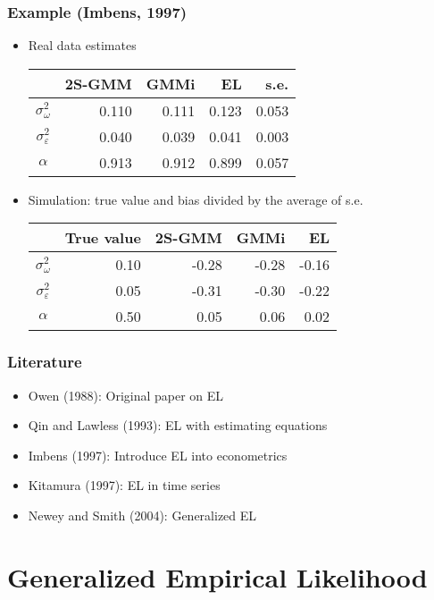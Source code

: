 \documentclass{beamer}
\begin{document}
\begin{frame}
\frametitle{ Example (Imbens, 1997)}
\begin{itemize}
\item Real data estimates \\ \vspace{0.3cm}
\centering
\begin{tabular}{crrrr}\hline
& 2S-GMM & GMMi & EL & s.e. \\\hline
\(\sigma_\omega^2\)     & 0.110 & 0.111 & 0.123 & 0.053 \\
\(\sigma_\varepsilon^2\)& 0.040 & 0.039 & 0.041 & 0.003 \\
\(\alpha\)              & 0.913 & 0.912 & 0.899 & 0.057 \\ \hline
\end{tabular}
\pause 
\vspace{0.3cm}

\raggedright
\item Simulation: true value and bias divided by the average of s.e. \\ \vspace{0.3cm}
\centering
\begin{tabular}{crrrr}\hline
 & True value & 2S-GMM & GMMi & EL  \\\hline
\(\sigma_\omega^2\)      & 0.10 & -0.28 & -0.28 & -0.16 \\
\(\sigma_\varepsilon^2\) & 0.05 & -0.31 & -0.30 & -0.22 \\
\(\alpha\)               & 0.50 &  0.05 & 0.06 &   0.02 \\ \hline
\end{tabular}
\end{itemize}
\end{frame}


\begin{frame}
\frametitle{Literature}
\begin{itemize}
\item Owen (1988): Original paper on EL
\item Qin and Lawless (1993): EL with estimating equations
\item Imbens (1997): Introduce EL into econometrics
\item Kitamura (1997): EL in time series
\item Newey and Smith (2004): Generalized EL
\end{itemize}
\end{frame}


\section[GEL]{Generalized Empirical Likelihood}
\frame{\sectionpage}
\end{document}
